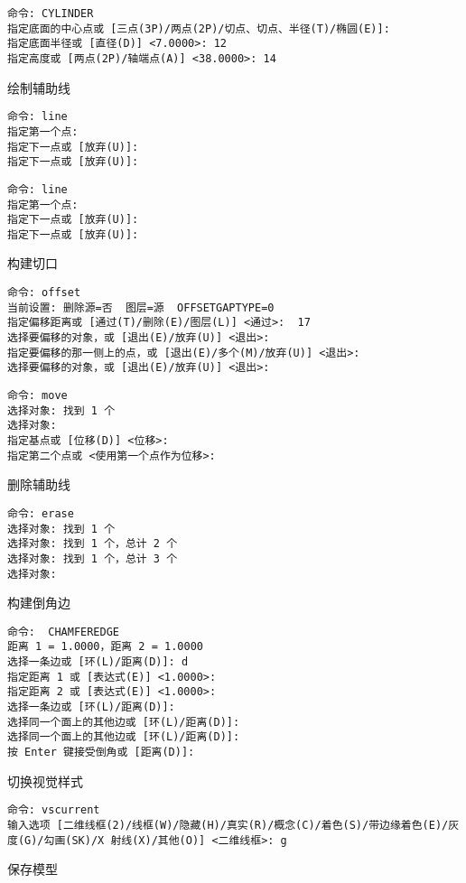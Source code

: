 \begin{procedure}
\begin{lstlisting}
命令: CYLINDER
指定底面的中心点或 [三点(3P)/两点(2P)/切点、切点、半径(T)/椭圆(E)]:
指定底面半径或 [直径(D)] <7.0000>: 12
指定高度或 [两点(2P)/轴端点(A)] <38.0000>: 14
\end{lstlisting}
\item 绘制辅助线
\begin{lstlisting}
命令: line
指定第一个点:
指定下一点或 [放弃(U)]: 
指定下一点或 [放弃(U)]:
\end{lstlisting}
\begin{lstlisting}
命令: line
指定第一个点:
指定下一点或 [放弃(U)]:
指定下一点或 [放弃(U)]:
\end{lstlisting}
\item 构建切口
\begin{lstlisting}
命令: offset
当前设置: 删除源=否  图层=源  OFFSETGAPTYPE=0
指定偏移距离或 [通过(T)/删除(E)/图层(L)] <通过>:  17
选择要偏移的对象，或 [退出(E)/放弃(U)] <退出>:
指定要偏移的那一侧上的点，或 [退出(E)/多个(M)/放弃(U)] <退出>:
选择要偏移的对象，或 [退出(E)/放弃(U)] <退出>:
\end{lstlisting}
\begin{lstlisting}
命令: move
选择对象: 找到 1 个
选择对象:
指定基点或 [位移(D)] <位移>:
指定第二个点或 <使用第一个点作为位移>:
\end{lstlisting}
\item 删除辅助线
\begin{lstlisting}
命令: erase
选择对象: 找到 1 个
选择对象: 找到 1 个，总计 2 个
选择对象: 找到 1 个，总计 3 个
选择对象:
\end{lstlisting}
\item 构建倒角边
\begin{lstlisting}
命令:  CHAMFEREDGE
距离 1 = 1.0000，距离 2 = 1.0000
选择一条边或 [环(L)/距离(D)]: d
指定距离 1 或 [表达式(E)] <1.0000>:
指定距离 2 或 [表达式(E)] <1.0000>:
选择一条边或 [环(L)/距离(D)]:
选择同一个面上的其他边或 [环(L)/距离(D)]:
选择同一个面上的其他边或 [环(L)/距离(D)]:
按 Enter 键接受倒角或 [距离(D)]:
\end{lstlisting}
\item 切换视觉样式
\begin{lstlisting}
命令: vscurrent
输入选项 [二维线框(2)/线框(W)/隐藏(H)/真实(R)/概念(C)/着色(S)/带边缘着色(E)/灰度(G)/勾画(SK)/X 射线(X)/其他(O)] <二维线框>: g
\end{lstlisting}

\item 保存模型
\end{procedure}
\endinput